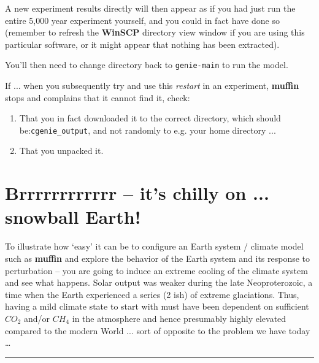 \documentclass[11pt,fleqn]{book} %
\begin{document}
A new experiment results directly will then appear as if you had just run the entire 5,000 year experiment yourself, and you could in fact have done so (remember to refresh the \textbf{WinSCP} directory view window if you are using this particular software, or it might appear that nothing has been extracted).

You’ll then need to change directory back to \texttt{genie-main} to run the model.

If ... when you subsequently try and use this \textit{restart} in an experiment, \textbf{muffin} stops and complains that it cannot find it, check:
\begin{enumerate}[noitemsep]
\vspace{1mm}
\item That you in fact downloaded it to the correct directory, which should be:\texttt{cgenie\_output}, and not randomly to e.g. your home directory ...
\vspace{1mm}
\item That you unpacked it.
\end{enumerate}


\newpage


\section{Brrrrrrrrrrrr – it’s chilly on ... snowball Earth!}

To illustrate how ‘easy’ it can be to configure an Earth system / climate model such as \textbf{muffin} and explore the behavior of the Earth system and its response to perturbation – you are going to induce an extreme cooling of the climate system and see what happens. Solar output was weaker during the late Neoproterozoic, a time when the Earth experienced a series (2 ish) of extreme glaciations. Thus, having a mild climate state to start with must have been dependent on sufficient \(CO_{2}\) and/or \(CH_{4}\) in the atmosphere and hence presumably highly elevated compared to the modern World ... sort of opposite to the problem we have today …

\vspace{1mm}
\noindent\rule{4cm}{0.5pt}
\vspace{2mm}
\end{document}
